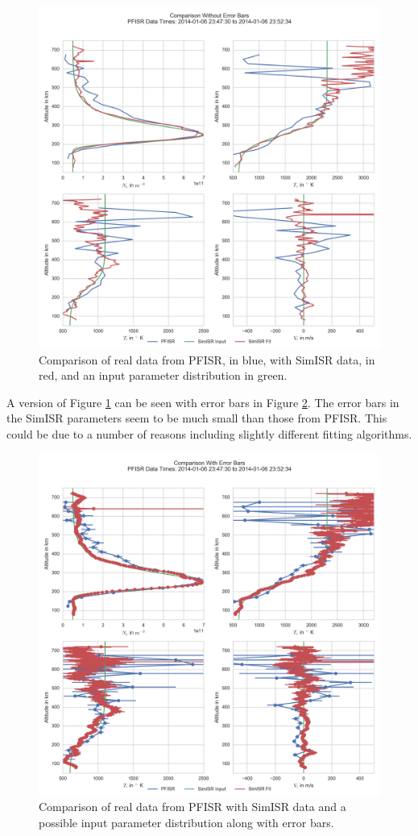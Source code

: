 \begin{figure}[h!]
\centering
\includegraphics[width=4.5in]{Paramcomp}
\caption{Comparison of real data from PFISR, in blue, with SimISR data, in red, and an input parameter distribution in green.}
\label{fig:simisrparamcomp}
\end{figure}

A version of Figure \ref{fig:simisrparamcomp} can be seen with error bars in Figure \ref{fig:simisrparamcompeb}. The error bars in the SimISR parameters seem to be much small than those from PFISR. This could be due to a number of reasons including slightly different fitting algorithms.

\begin{figure}[h!]
\centering
\includegraphics[width=4.5in]{Paramcompeb}
\caption{Comparison of real data from PFISR with SimISR data and a possible input parameter distribution along with error bars.}
\label{fig:simisrparamcompeb}
\end{figure}

